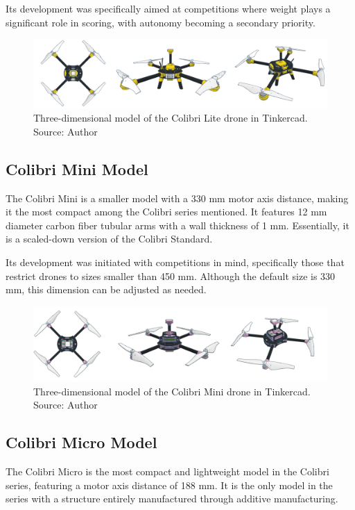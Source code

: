 \documentclass[conference]{IEEEtran}
\begin{document}
Its development was specifically aimed at competitions where weight plays a significant role in scoring, with autonomy becoming a secondary priority.

\begin{figure}[!htb]
    \centering
    \includegraphics[scale=0.14]{img/Colibri-lite.png} 
    \caption{Three-dimensional model of the Colibri Lite drone in Tinkercad. Source: Author}
    \label{fig:my_label}
\end{figure}

\subsection{Colibri Mini Model}
The Colibri Mini is a smaller model with a 330 mm motor axis distance, making it the most compact among the Colibri series mentioned. It features 12 mm diameter carbon fiber tubular arms with a wall thickness of 1 mm. Essentially, it is a scaled-down version of the Colibri Standard.

Its development was initiated with competitions in mind, specifically those that restrict drones to sizes smaller than 450 mm. Although the default size is 330 mm, this dimension can be adjusted as needed.

\begin{figure}[!htb]
    \centering
    \includegraphics[scale=0.14]{img/Colibri-mini.png} 
    \caption{Three-dimensional model of the Colibri Mini drone in Tinkercad. Source: Author}
    \label{fig:my_label}
\end{figure}

\subsection{Colibri Micro Model}

The Colibri Micro is the most compact and lightweight model in the Colibri series, featuring a motor axis distance of 188 mm. It is the only model in the series with a structure entirely manufactured through additive manufacturing.
\end{document}
